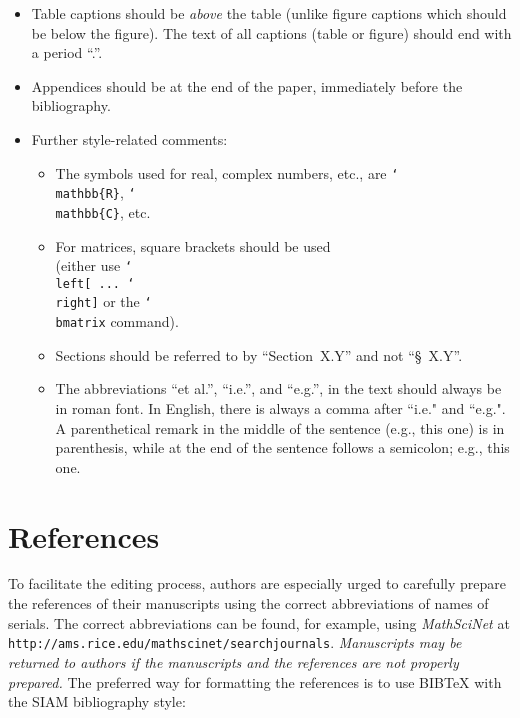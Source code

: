 \documentclass[10pt]{article}
\begin{document}
\begin{itemize}
\item Table captions should be {\em above} the table (unlike figure captions which
should be below the figure). The text of all captions (table or figure)
should end with a period ``.''.

\item Appendices should be at the end of the paper, immediately before the
bibliography.

\item Further style-related comments:
\begin{itemize}
\item The symbols used for real, complex numbers, etc.,
are {\tt {\char`\\mathbb\{R\}}}, {\tt {\char`\\mathbb\{C\}}}, etc.
%
\item For matrices, square brackets should be used \\
(either use
{\tt \char`\\left[ ... \char`\\right]} or the {\tt \char`\\bmatrix}
command).
%
\item Sections should be referred to by ``Section~X.Y'' and not ``\S~X.Y''.
%
\item The abbreviations ``et al.'', ``i.e.'', and ``e.g.'', in the text
should always be in roman font.
In English, there is always a comma after ``i.e." and ``e.g.".
%
A parenthetical remark in the middle of the sentence
(e.g., this one) is in parenthesis, while at the end
of the sentence follows a semicolon; e.g., this one.
%
\end{itemize}
\end{itemize}


\section{References}
To facilitate the editing process, authors are especially urged to
carefully prepare the references of their manuscripts using the
correct abbreviations of names of serials. The correct abbreviations
can be found, for example, using {\em MathSciNet} at {\tt
http://ams.rice.edu/mathscinet/searchjournals}.
%
{\em Manuscripts may be returned to authors if the manuscripts and the
references are not properly prepared.} The preferred way for formatting
the references is to use BIBTeX with the SIAM bibliography style:
\end{document}
